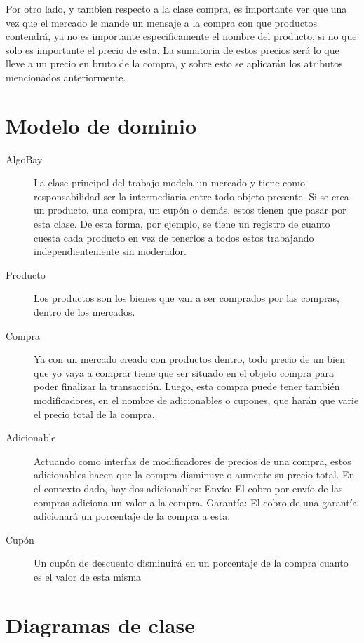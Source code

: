 \documentclass[titlepage,a4paper]{article}
\begin{document}
Por otro lado, y tambien respecto a la clase compra, es importante ver que una vez que el mercado le mande un mensaje a la compra con que productos contendrá, ya no es importante especificamente el nombre del producto, si no que solo es importante el precio de esta. La sumatoria de estos precios será lo que lleve a un precio en bruto de la compra, y sobre esto se aplicarán los atributos mencionados anteriormente.

\section{Modelo de dominio}\label{sec:modelo}

\begin{description}
\item[AlgoBay] La clase principal del trabajo modela un mercado y tiene como responsabilidad ser la intermediaria entre todo objeto presente. Si se crea un producto, una compra, un cupón o demás, estos tienen que pasar por esta clase. De esta forma, por ejemplo, se tiene un registro de cuanto cuesta cada producto en vez de tenerlos a todos estos trabajando independientemente sin moderador.
\item[Producto] Los productos son los bienes que van a ser comprados por las compras, dentro de los mercados.
\item[Compra] Ya con un mercado creado con productos dentro, todo precio de un bien que yo vaya a comprar tiene que ser situado en el objeto compra para poder finalizar la transacción. Luego, esta compra puede tener también modificadores, en el nombre de adicionables o cupones, que harán que varie el precio total de la compra.
\item[Adicionable] Actuando como interfaz de modificadores de precios de una compra, estos adicionables hacen que la compra disminuye o aumente su precio total. En el contexto dado, hay dos adicionables:
\subitem Envío: El cobro por envío de las compras adiciona un valor a la compra.
\subitem Garantía: El cobro de una garantía adicionará un porcentaje de la compra a esta.
\item[Cupón] Un cupón de descuento disminuirá en un porcentaje de la compra cuanto es el valor de esta misma
\end{description}

\section{Diagramas de clase}\label{sec:diagramasdeclase}
\end{document}
